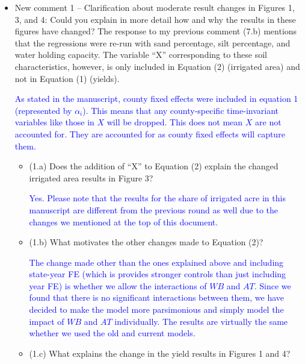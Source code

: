 \documentclass[
]{article}
\begin{document}
\begin{itemize}
\item New comment 1 – Clarification about moderate result changes in Figures 1, 3, and 4: Could you explain in more detail how and why the results in these figures have changed? The response to my previous comment (7.b) mentions that the regressions were re-run with sand percentage, silt percentage, and water holding capacity. The variable ``X'' corresponding to these soil characteristics, however, is only included in Equation (2) (irrigated area) and not in Equation (1) (yields).

  \textcolor{blue}{As stated in the manuscript, county fixed effects were included in equation 1 (represented by $\alpha_i$). This means that any county-specific time-invariant variables like those in $X$ will be dropped. This does not mean $X$ are not accounted for. They are accounted for as county fixed effects will capture them.}

  \begin{itemize}
  \item (1.a) Does the addition of ``X'' to Equation (2) explain the changed irrigated area results in Figure 3?

  \textcolor{blue}{Yes. Please note that the results for the share of irrigated acre in this manuscript are different from the previous round as well due to the changes we mentioned at the top of this document.}
  
  \item (1.b) What motivates the other changes made to Equation (2)?

  \textcolor{blue}{The change made other than the ones explained above and including state-year FE (which is provides stronger controls than just including year FE) is whether we allow the interactions of $WB$ and $AT$. Since we found that there is no significant interactions between them, we have decided to make the model more parsimonious and simply model the impact of $WB$ and $AT$ individually. The results are virtually the same whether we used the old and current models.}
  
  \item (1.c) What explains the change in the yield results in Figures 1 and 4?


\end{itemize}
\end{itemize}
\end{document}
